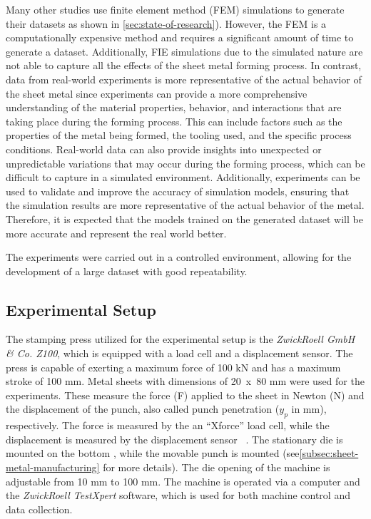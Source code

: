 {Many other studies use finite element method (FEM) simulations to generate their datasets as shown in
\cref{sec:state-of-research}).
However, the FEM is a computationally expensive method and requires a significant amount of time to
generate a dataset.
Additionally, FIE simulations due to the simulated nature are not able to capture all the effects of the sheet metal
forming process.
In contrast, data from real-world experiments is more representative of the actual behavior of the sheet metal since
experiments can provide a more comprehensive understanding of the material properties, behavior, and interactions
that are taking place during the forming process.
This can include factors such as the properties of the metal being formed, the tooling used, and the specific process
conditions.
Real-world data can also provide insights into unexpected or unpredictable variations that may occur during the
forming process, which can be difficult to capture in a simulated environment.
Additionally, experiments can be used to validate and improve the accuracy of simulation models, ensuring that the
simulation results are more representative of the actual behavior of the metal.
Therefore, it is expected that the models trained on the generated dataset will be more accurate and represent the real
world better.

The experiments were carried out in a controlled environment, allowing for the development of a large dataset with
good repeatability.

\subsection{Experimental Setup}\label{subsec:experimental-setup}
The stamping press utilized for the experimental setup is the \textit{ZwickRoell GmbH \& Co. Z100}, which is
equipped with a load cell and a displacement sensor.
The press is capable of exerting a maximum force of 100 kN and has a maximum stroke of 100 mm.
Metal sheets with dimensions of 20~x~80 mm were used for the experiments.
These measure the force (F) applied to the sheet in Newton (N) and the displacement of the punch, also called
punch penetration ($y_p$ in mm), respectively.
The force is measured by the an ``Xforce'' load cell, while the displacement is measured by the displacement sensor
~\cite{_xforceloadcell_}.
The stationary die is mounted on the bottom , while the movable punch is mounted
(see\cref{subsec:sheet-metal-manufacturing} for more details).
The die opening of the machine is adjustable from 10 mm to 100 mm.
The machine is operated via a computer and the \textit{ZwickRoell TestXpert} software, which is used for both machine
control and data collection.

}
